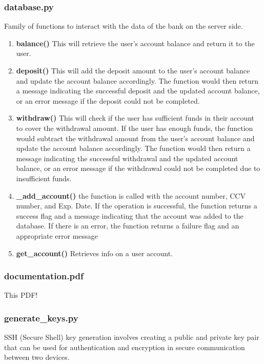 \documentclass{article}
\begin{document}
\subsubsection{database.py}
Family of functions to interact with the data of the bank on the server side.
\begin{enumerate}
    \item \textbf{balance()}
    This will retrieve the user's account balance and return it to the user.
    \item \textbf{deposit()}
    This will add the deposit amount to the user's account balance and update the account balance accordingly.
    The function would then return a message indicating the successful deposit and the updated account balance, or an error message if the deposit could not be completed.
    \item \textbf{withdraw()}
    This will check if the user has sufficient funds in their account to cover the withdrawal amount.
    If the user has enough funds, the function would subtract the withdrawal amount from the user's account balance and update the account balance accordingly.
    The function would then return a message indicating the successful withdrawal and the updated account balance, or an error message if the withdrawal could not be completed due to insufficient funds.
    \item \textbf{\_add\_account()}
    the function is called with the account number, CCV number, and Exp. Date. If the operation is successful, the function returns a success flag and a message indicating that the account was added to the database. If there is an error, the function returns a failure flag and an appropriate error message
    \item \textbf{get\_account()}
    Retrieves info on a user account.
\end{enumerate}

\subsubsection{documentation.pdf}
This PDF!

\subsubsection{generate\_keys.py}
SSH (Secure Shell) key generation involves creating a public and private key pair that can be used for authentication and encryption in secure communication between two devices.
\end{document}

